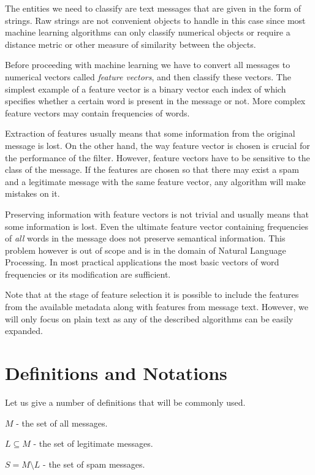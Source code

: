 \documentclass[12pt]{report}
\begin{document}
The entities we need to classify are text messages that are given in the form of strings. Raw strings are not convenient objects to handle in this case since most machine learning algorithms can only classify numerical objects or require a distance metric or other measure of similarity between the objects.

Before proceeding with machine learning we have to convert all messages to numerical vectors called \textit{feature vectors}, and then classify these vectors. The simplest example of a feature vector is a binary vector each index of which specifies whether a certain word is present in the message or not. More complex feature vectors may contain frequencies of words.

Extraction of features usually means that some information from the original message is lost. On the other hand, the way feature vector is chosen is crucial for the performance of the filter. However, feature vectors have to be sensitive to the class of the message. If the features are chosen so that there may exist a spam and a legitimate message with the same feature vector, any algorithm will make mistakes on it.

Preserving information with feature vectors is not trivial and usually means that some information is lost. Even the ultimate feature vector containing frequencies of \textit{all} words in the message does not preserve semantical information. This problem however is out of scope and is in the domain of Natural Language Processing. In most practical applications the most basic vectors of word frequencies or its modification are sufficient.

Note that at the stage of feature selection it is possible to include the features from the available metadata along with features from message text. However, we will only focus on plain text as any of the described algorithms can be easily expanded.

\newpage

\section{Definitions and Notations}

Let us give a number of definitions that will be commonly used.

$M$ - the set of all messages.

$L \subseteq M$ - the set of legitimate messages.

$S = M \setminus L$ - the set of spam messages.
\end{document}
